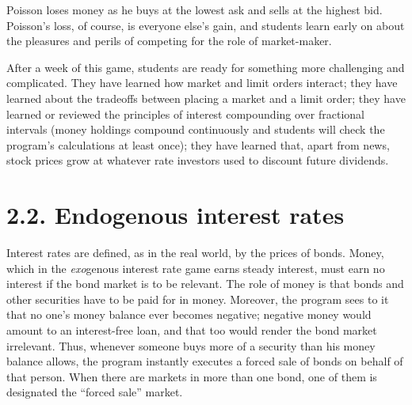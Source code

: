 Poisson loses money as he buys at the lowest ask and sells at the highest 
bid.  Poisson's loss, of course, is everyone else's gain, and students 
learn early on about the pleasures and perils of competing for the 
role of market-maker.%
 
After a week of this game, students are ready for something more challenging 
and complicated.  They have learned how market and limit orders interact; 
they have learned about the tradeoffs between placing a market and a limit 
order; they have learned or reviewed the principles of interest compounding 
over fractional intervals (money holdings compound continuously and students 
will check the program's calculations at least once); they have learned 
that, apart from news, stock prices grow at whatever rate investors used 
to discount future dividends.%
 
 
\section{2.2. Endogenous interest rates}%
Interest rates are defined, as in the real world, by the prices of bonds. 
Money, which in the {\it exo}genous interest rate game earns steady 
interest, must earn no interest if the bond market is to be relevant. 
The role of money is that bonds and other securities have to be paid for in money.  Moreover, 
the program sees to it that no one's money balance ever becomes negative; 
negative money would amount to an interest-free loan, and that too would 
render the bond market irrelevant.  Thus, whenever someone buys more 
of a security than his money balance allows, the program instantly executes 
a forced sale of bonds on behalf of that person.%
When there are 
markets in more than one bond, one of them is designated the ``forced 
sale'' market.%
 
